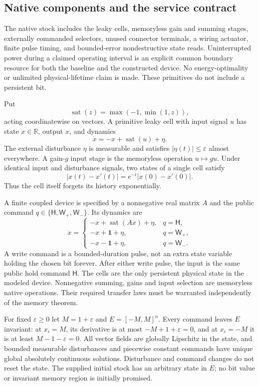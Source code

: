 \documentclass[11pt]{article}
\theoremstyle{definition}
\theoremstyle{remark}
\newcommand{\R}{\mathbb R}
\newcommand{\sat}{\operatorname{sat}}
\begin{document}
\subsection{Native components and the service contract}
The native stock includes the leaky cells, memoryless gain and summing
stages, externally commanded selectors, unused connector terminals, a
wiring actuator, finite pulse timing, and bounded-error nondestructive
state reads. Uninterrupted power during a claimed operating interval is
an explicit common boundary resource for both the baseline and the
constructed device. No energy-optimality or unlimited physical-lifetime
claim is made. These primitives do not include a persistent bit.

Put
\[
 \sat(z)=\max(-1,\min(1,z)),
\]
acting coordinatewise on vectors. A primitive leaky cell with input signal $u$ has state $x\in\R$, output $x$, and dynamics
\begin{equation}\label{fb:eq:cell}
 \dot x=-x+\sat(u)+\eta.
\end{equation}
The external disturbance $\eta$ is measurable and satisfies $|\eta(t)|\leq\varepsilon$ almost everywhere. A gain-$g$ input stage is the memoryless operation $u\mapsto gu$. Under identical input and disturbance signals, two states of a single cell satisfy
\[
 |x(t)-x'(t)|=e^{-t}|x(0)-x'(0)|.
\]
Thus the cell itself forgets its history exponentially.

A finite coupled device is specified by a nonnegative real matrix $A$ and the public command $q\in\{\mathsf H,\mathsf W_+,\mathsf W_-\}$. Its dynamics are
\begin{equation}\label{fb:eq:network}
 \dot x=
 \begin{cases}
  -x+\sat(Ax)+\eta,&q=\mathsf H,\\
  -x+\boldsymbol 1+\eta,&q=\mathsf W_+,\\
  -x-\boldsymbol 1+\eta,&q=\mathsf W_-.
 \end{cases}
\end{equation}
A write command is a bounded-duration pulse, not an extra state variable holding the chosen bit forever. After either write pulse, the input is the same public hold command $\mathsf H$. The cells are the only persistent physical state in the modeled device. Nonnegative summing, gains and input selection are memoryless native operations. Their required transfer laws must be warranted independently of the memory theorem.

For fixed $\varepsilon\geq0$ let $M=1+\varepsilon$ and $E=[-M,M]^n$. Every command leaves $E$ invariant: at $x_i=M$, its derivative is at most $-M+1+\varepsilon=0$, and at $x_i=-M$ it is at least $M-1-\varepsilon=0$. All vector fields are globally Lipschitz in the state, and bounded measurable disturbances and piecewise constant commands have unique global absolutely continuous solutions. Disturbance and command changes do not reset the state. The supplied
initial stock has an arbitrary state in $E$; no bit value or invariant
memory region is initially promised.
\end{document}
